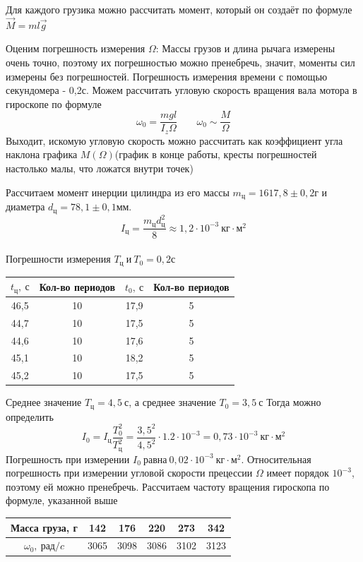 \documentclass[a4paper, 12pt]{article}
\begin{document}
		Для каждого грузика можно рассчитать момент, который он создаёт по формуле $\vec{M} = ml \vec{g}$
		\par
		Оценим погрешность измерения $\Omega$:
		Массы грузов и длина рычага измерены очень точно, поэтому их погрешностью можно пренебречь, значит, моменты сил измерены без погрешностей.
		Погрешность измерения времени с помощью секундомера - 0,2с.
		Можем рассчитать угловую скорость вращения вала мотора в гироскопе по формуле
		$$\omega_0 = \frac{mgl}{I_z \Omega} \;\;\;\;\;\;\; \omega_0 \sim \frac{M}{\Omega}$$
		Выходит, искомую угловую скорость можно рассчитать как коэффициент угла наклона графика $M(\Omega)$(график в конце работы, кресты погрешностей настолько малы, что ложатся внутри точек)
		\par
		Рассчитаем момент инерции цилиндра из его массы $m_ц = 1617,8 \pm 0,2г$ и диаметра $d_ц = 78,1 \pm 0,1мм$.
		$$I_ц = \frac{m_ц d_ц^2}{8} \approx 1,2 \cdot 10^{-3}\: кг \cdot м^2$$ \\
		Погрешности измерения $T_ц\: и\: T_0 = 0,2 с$
		\thispagestyle{empty}
		\begin{longtable}[H]{|c|c||c|c|}
			\hline
			$t_ц,\: с$ & Кол-во периодов & $t_0,\: с$ & Кол-во периодов \\
			\hline
			46,5 & 10 & 17,9 & 5 \\
			\hline
			44,7 & 10 & 17,5 & 5 \\
			\hline
			44,6 & 10 & 17,6 & 5 \\
			\hline
			45,1 & 10 & 18,2 & 5 \\
			\hline
			45,2 & 10 & 17,5 & 5 \\
			\hline
		\end{longtable}
		\thispagestyle{plain}
		Среднее значение $T_ц = 4,5\: с$, а среднее значение $T_0 = 3,5\: с$
		Тогда можно определить
		$$I_0 = I_ц \frac{T_0^2}{T_ц^2} =\frac{3,5^2}{4,5^2} \cdot 1.2 \cdot 10^{-3} = 0,73 \cdot 10^{-3}\: кг \cdot м^2$$
		Погрешность при измерении $I_0\: равна\: 0,02 \cdot 10^{-3}\: кг \cdot м^2$.
		Относительная погрешность при измерении угловой скорости прецессии $\Omega$ имеет порядок $10^{-3}$, поэтому ей можно пренебречь.
		Рассчитаем частоту вращения гироскопа по формуле, указанной выше
		\begin{longtable}[H]{|c|c|c|c|c|c|}
			\hline
			Масса груза, г & 142 & 176 & 220 & 273 & 342 \\
			\hline
			$\omega_0,\: рад/c$ & 3065 & 3098 & 3086 & 3102 & 3123 \\
			\hline
		\end{longtable}
\end{document}
